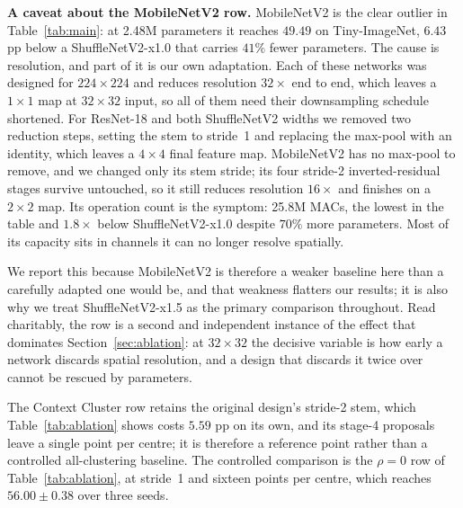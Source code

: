 \textbf{A caveat about the MobileNetV2 row.} MobileNetV2 is the clear outlier
in Table~\ref{tab:main}: at 2.48M parameters it reaches $49.49$ on
Tiny-ImageNet, $6.43$ pp below a ShuffleNetV2-x1.0 that carries $41\%$ fewer
parameters. The cause is resolution, and part of it is our own adaptation.
Each of these networks was designed for $224\times224$ and reduces resolution
$32\times$ end to end, which leaves a $1\times1$ map at $32\times32$ input, so
all of them need their downsampling schedule shortened. For ResNet-18 and both
ShuffleNetV2 widths we removed two reduction steps, setting the stem to
stride~1 and replacing the max-pool with an identity, which leaves a
$4\times4$ final feature map. MobileNetV2 has no max-pool to remove, and we
changed only its stem stride; its four stride-2 inverted-residual stages
survive untouched, so it still reduces resolution $16\times$ and finishes on a
$2\times2$ map. Its operation count is the symptom: 25.8M MACs, the lowest in
the table and $1.8\times$ below ShuffleNetV2-x1.0 despite $70\%$ more
parameters. Most of its capacity sits in channels it can no longer resolve
spatially.

We report this because MobileNetV2 is therefore a weaker baseline here than a
carefully adapted one would be, and that weakness flatters our results; it is
also why we treat ShuffleNetV2-x1.5 as the primary comparison throughout.
Read charitably, the row is a second and independent instance of the effect
that dominates
Section~\ref{sec:ablation}: at $32\times32$ the decisive variable is how early
a network discards spatial resolution, and a design that discards it twice
over cannot be rescued by parameters.

The Context Cluster row retains the original design's stride-2 stem, which
Table~\ref{tab:ablation} shows costs $5.59$ pp on its own, and its stage-4
proposals leave a single point per centre; it is therefore a reference point
rather than a controlled all-clustering baseline. The controlled comparison is
the $\rho = 0$ row of Table~\ref{tab:ablation}, at stride~1 and sixteen points
per centre, which reaches $56.00 \pm 0.38$ over three seeds.

